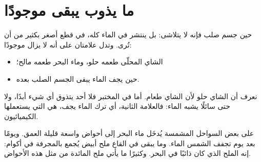 \section{ما يذوب يبقى موجودًا}

\begin{proposition}\label{prop:g2:mixing-and-dissolving:still-there}
حين  جسم صلب فإنه لا يتلاشى: بل ينتشر في الماء كله، في قطع أصغر
بكثير من أن تُرى. وتدل علامتان على أنه لا يزال موجودًا:
\begin{itemize}
  \item الشاي المحلّى طعمه حلو، وماء البحر طعمه مالح؛
  \item حين يجف الماء يبقى الجسم الصلب بعده.
\end{itemize}
\end{proposition}

\begin{remark}\label{rem:g2:mixing-and-dissolving:no-tasting}
نعرف أن الشاي حلو لأن الشاي طعام. أما في المختبر فلا أحد يتذوق أي
شيء أبدًا، ولا حتى سائلًا يشبه الماء: فالعلامة الثانية، أي ترك الماء
يجف، هي التي يستعملها الكيميائيون.
\end{remark}

\begin{example}\label{ex:g2:mixing-and-dissolving:salt-pans}
على بعض السواحل المشمسة يُدخَل ماء البحر إلى أحواض واسعة قليلة العمق.
ويومًا بعد يوم تجفف الشمس الماء. وما يبقى في القاع ملح أبيض يُجمع
بالمجرفة في أكوام: إنه الملح الذي كان ذائبًا في البحر. وكثيرًا ما يأتي
ملح المائدة من مثل هذه الأحواض.
\end{example}

